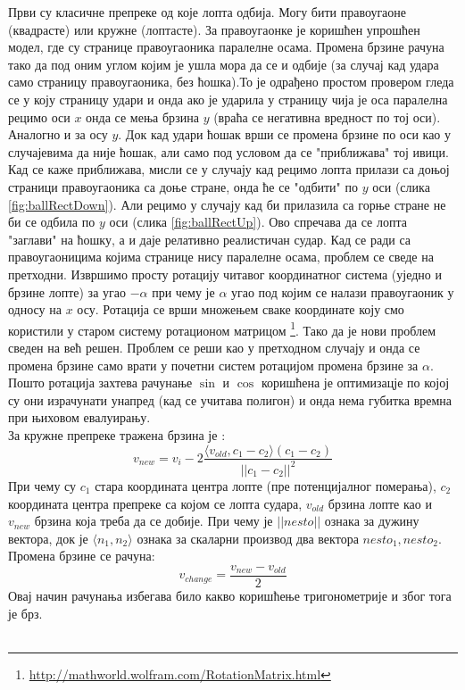 Први су класичне препреке од које лопта одбија. Могу бити правоугаоне (квадрасте) или кружне (лоптасте).
За правоугаонке је коришћен упрошћен модел, где су странице правоугаоника паралелне осама.
Промена брзине рачуна тако да под оним углом којим је ушла мора да се и одбије (за случај кад удара само страницу правоугаоника, без ћошка).То је одрађено простом провером гледа се у коју страницу удари и онда ако је ударила у страницу чија је оса паралелна рецимо оси $x$ онда се мења брзина $y$ (враћа се негативна вредност по тој оси). Аналогно и за осу $y$.  Док кад удари ћошак врши се промена брзине по оси као у случајевима да није ћошак, али само под условом да се "приближава" тој ивици. Кад се каже приближава, мисли се у случају кад рецимо лопта прилази са доњој страници правоугаоника са доње стране, онда ће се "одбити" по $y$ оси (слика \ref{fig:ballRectDown}). Али рецимо у случају кад би прилазила са горње стране не би се одбила по $y$ оси (слика \ref{fig:ballRectUp}).   Ово спречава да се лопта "заглави" на ћошку, а и даје релативно реалистичан судар. Кад се ради са правоугаоницима којима странице нису паралелне осама, проблем се сведе на претходни. Извршимо просту ротацију читавог координатног система (уједно и брзине лопте) за угао $-\alpha$ при чему је $\alpha$ угао под којим се налази правоугаоник у односу на $x$ осу. Ротација се врши множењем сваке координате коју смо користили у старом систему ротационом матрицом \footnote{\url{http://mathworld.wolfram.com/RotationMatrix.html}}. Тако да је нови проблем сведен на већ решен. Проблем се реши као у претходном случају и онда се промена брзине само врати у почетни систем ротацијом промена брзине за $\alpha$. Пошто ротација захтева рачунање $\sin$ и $\cos$ коришћена је оптимизацје по којој су они израчунати унапред (кад се учитава полигон) и онда нема губитка времна при њиховом евалуирању.
\\ \indent
За кружне препреке тражена брзина је :
$$v_{new} = v_i - 2 \frac{\langle v_{old}, c_1 - c_2 \rangle (c_1 - c_2)}{||c_1-c_2 ||^2 }$$
При чему су $c_1$ стара координата центра лопте (пре потенцијалног померања), $c_2$ координата центра препреке са којом се лопта судара, $v_{old}$ брзина лопте као и $v_{new}$ брзина која треба да се добије. При чему је $|| nesto||$ ознака за дужину вектора, док је $\langle n_1, n_2 \rangle$ ознака за скаларни производ два вектора $nesto_1, nesto_2$. Промена брзине се рачуна:
$$v_{change} = \frac{v_{new} - v_{old}}{2}$$
Овај начин рачунања избегава било какво коришћење тригонометрије и због тога је брз.
\\ \
